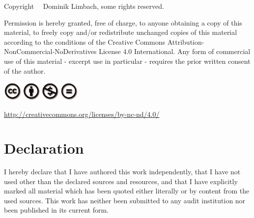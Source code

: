 \documentclass[
    12pt,
    a4paper,
	chapterprefix=false,
	parskip=full,
	headings=normal,
	numbers=noenddot
]{scrreprt}
\begin{document}
\clearpage
\vspace*{\fill}
\small
\begin{center}

	Copyright \textcopyright \ \the\year \ Dominik Limbach, some rights reserved.
	
	\begin{minipage}{0.85\textwidth}
		Permission is hereby granted, free of charge, to anyone obtaining a copy of this material, to freely copy and/or redistribute unchanged copies of this material according to the conditions of the Creative Commons Attribution-NonCommercial-NoDerivatives License 4.0 International. Any form of commercial use of this material - excerpt use in particular - requires the prior written consent of the author.
	\end{minipage}
	
	\includegraphics[width=4cm]{images/cc_by_nc_nd}
	
	\href{http://creativecommons.org/licenses/by-nc-nd/4.0/}{http://creativecommons.org/licenses/by-nc-nd/4.0/}

\end{center}
\normalsize
\thispagestyle{empty}
\clearpage




%




%


\newpage

\chapter*{Declaration}

I hereby declare that I have authored this work independently, that I have not used other than the declared sources and resources, and that I have explicitly marked all material which has been quoted either literally or by content from the used sources. This work has neither been submitted to any audit institution nor been published in its current form.\\
\end{document}
